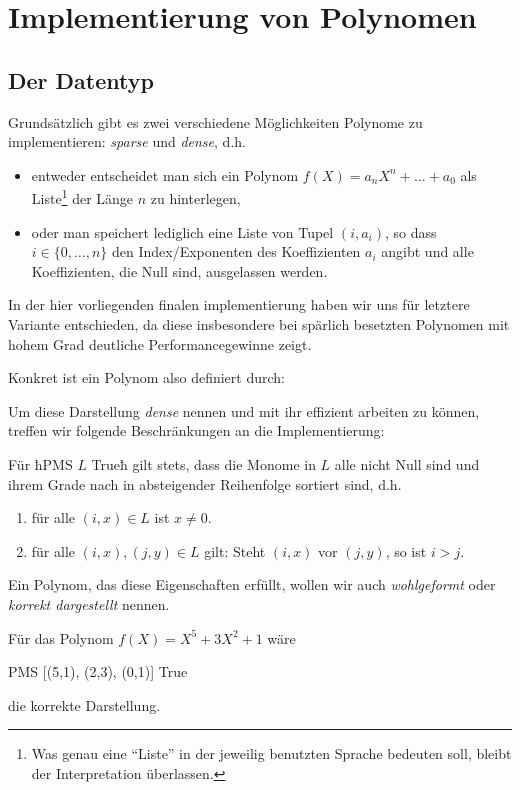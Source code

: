 \section{Implementierung von Polynomen}

\subsection{Der Datentyp}

Grundsätzlich gibt es zwei verschiedene Möglichkeiten Polynome zu
implementieren: \emph{sparse} und \emph{dense}, d.h. 
\begin{itemize}
  \item entweder entscheidet man
    sich ein Polynom $f(X) = a_nX^n + \ldots + a_0$ als Liste\footnote{Was genau 
    eine ``Liste'' in der jeweilig benutzten Sprache bedeuten soll, bleibt der
    Interpretation überlassen.} der Länge $n$ zu hinterlegen,
  \item oder man speichert lediglich eine Liste von Tupel $(i,a_i)$, so dass
    $i \in \{0,\ldots,n\}$ den Index/Exponenten des Koeffizienten $a_i$ angibt
    und alle Koeffizienten, die Null sind, ausgelassen werden.
\end{itemize}
In der hier vorliegenden finalen implementierung haben wir uns für letztere
Variante entschieden, da diese insbesondere bei spärlich besetzten Polynomen
mit hohem Grad deutliche Performancegewinne zeigt.

Konkret ist ein Polynom also definiert durch:

Um diese Darstellung \emph{dense} nennen und mit ihr effizient arbeiten zu 
können, treffen wir folgende Beschränkungen an die Implementierung:
\begin{invariante}
  \label{inv:poly}
  Für ħPMS $L$ Trueħ gilt stets, dass die Monome in $L$ alle nicht Null 
  sind und ihrem Grade nach in
  absteigender Reihenfolge sortiert sind, d.h.
  \begin{enumerate}
    \item für alle $(i,x) \in L$ ist $x \neq 0$.
    \item für alle $(i,x), (j,y) \in L$ gilt: Steht $(i,x)$ vor $(j,y)$, so ist
      $i > j$.
  \end{enumerate}
  Ein Polynom, das diese Eigenschaften erfüllt, wollen wir auch 
  \emph{wohlgeformt} oder \emph{korrekt dargestellt} nennen.
\end{invariante}

\begin{beispiel}
  Für das Polynom $f(X) = X^5 + 3X^2 + 1$ wäre 
  \begin{hcode}
    PMS [(5,1), (2,3), (0,1)] True
  \end{hcode}
  die korrekte Darstellung.
\end{beispiel}

